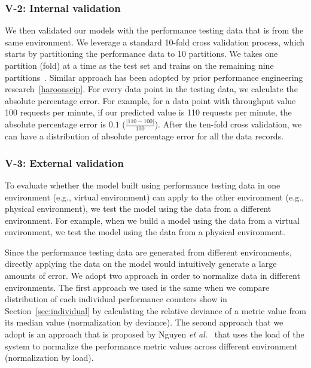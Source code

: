 \subsubsection{V-2: Internal validation}

We then validated our models with the performance testing data that is from the same environment. We leverage a standard 10-fold cross validation process, which starts by partitioning the performance data to 10 partitions. We takes one partition (fold) at a time as the test set and trains on the remaining nine partitions~\cite{10foldcross,kohavi1995study}. Similar approach has been adopted by prior performance engineering research~\ref{haroonseip}. For every data point in the testing data, we calculate the absolute percentage error. For example, for a data point with throughput value 100 requests per minute, if our predicted value is 110 requests per minute, the absolute percentage error is $0.1$ ($\frac{|110-100|}{100}$). After the ten-fold cross validation, we can have a distribution of absolute percentage error for all the data records.



\subsubsection{V-3: External validation}
To evaluate whether the model built using performance testing data in one environment (e.g., virtual environment) can apply to the other environment (e.g., physical environment), we test the model using the data from a different environment. For example, when we build a model using the data from a virtual environment, we test the model using the data from a physical environment. 

Since the performance testing data are generated from different environments, directly applying the data on the model would intuitively generate a large amounts of error. We adopt two approach in order to normalize data in different environments. The first approach we used is the same when we compare distribution of each individual performance counters show in Section~\ref{sec:individual} by calculating the relative deviance of a metric value from its median value (normalization by deviance). The second approach that we adopt is an approach that is proposed by Nguyen \textit{et al.}~\cite{Nguyen:2012:ADP:2188286.2188344} that uses the load of the system to normalize the performance metric values across different environment (normalization by load). 


